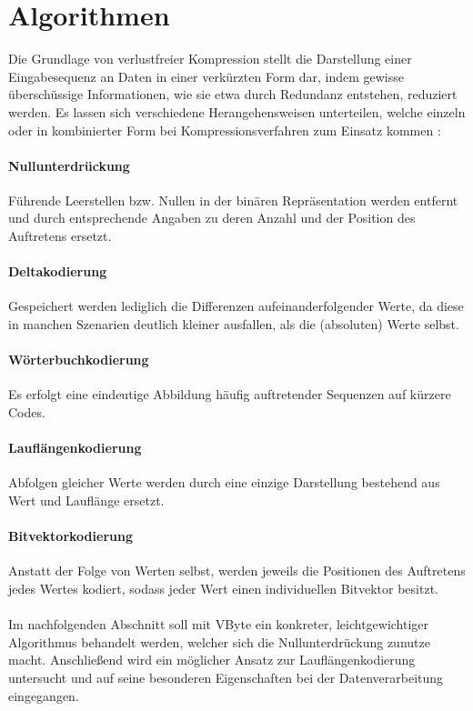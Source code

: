 \section{Algorithmen}

Die Grundlage von verlustfreier Kompression stellt die Darstellung einer Eingabesequenz an Daten in einer verkürzten Form dar, indem gewisse überschüssige Informationen, wie sie etwa durch Redundanz entstehen, reduziert werden. Es lassen sich verschiedene Herangehensweisen unterteilen, welche einzeln oder in kombinierter Form bei Kompressionsverfahren zum Einsatz kommen \cite{Abadi2006}\cite{Croft2009}:

\paragraph{Nullunterdrückung}
Führende Leerstellen bzw. Nullen in der binären Repräsentation werden entfernt und durch entsprechende Angaben zu deren Anzahl und der Position des Auftretens ersetzt.

\paragraph{Deltakodierung}
Gespeichert werden lediglich die Differenzen aufeinanderfolgender Werte, da diese in manchen Szenarien deutlich kleiner ausfallen, als die (absoluten) Werte selbst.

\paragraph{Wörterbuchkodierung}
Es erfolgt eine eindeutige Abbildung häufig auftretender Sequenzen auf kürzere Codes.

\paragraph{Lauflängenkodierung}
Abfolgen gleicher Werte werden durch eine einzige Darstellung bestehend aus Wert und Lauflänge ersetzt.

\paragraph{Bitvektorkodierung}
Anstatt der Folge von Werten selbst, werden jeweils die Positionen des Auftretens jedes Wertes kodiert, sodass jeder Wert einen individuellen Bitvektor besitzt.

\paragraph{}
\noindent Im nachfolgenden Abschnitt soll mit VByte ein konkreter, leichtgewichtiger Algorithmus behandelt werden, welcher sich die Nullunterdrückung zunutze macht. Anschließend wird ein möglicher Ansatz zur Lauflängenkodierung untersucht und auf seine besonderen Eigenschaften bei der Datenverarbeitung eingegangen.

